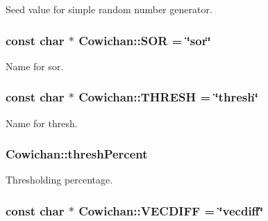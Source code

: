 Seed value for simple random number generator. \hypertarget{class_cowichan_eaac49e2ebb0c5149506f0544cd87794}{
\subsubsection[{SOR}]{\setlength{\rightskip}{0pt plus 5cm}const char $\ast$ {\bf Cowichan::SOR} = \char`\"{}sor\char`\"{}}}
\label{class_cowichan_eaac49e2ebb0c5149506f0544cd87794}


Name for sor. \hypertarget{class_cowichan_e7adc012eb484f209b869db5062dacd0}{
\subsubsection[{THRESH}]{\setlength{\rightskip}{0pt plus 5cm}const char $\ast$ {\bf Cowichan::THRESH} = \char`\"{}thresh\char`\"{}}}
\label{class_cowichan_e7adc012eb484f209b869db5062dacd0}


Name for thresh. \hypertarget{class_cowichan_a42c0ae639cc3ac124a013bc3e3162ad}{
\subsubsection[{threshPercent}]{ {\bf Cowichan::threshPercent}}}
\label{class_cowichan_a42c0ae639cc3ac124a013bc3e3162ad}


Thresholding percentage. \hypertarget{class_cowichan_d70f851efe3d20a89d7bcf5e7db70344}{
\subsubsection[{VECDIFF}]{\setlength{\rightskip}{0pt plus 5cm}const char $\ast$ {\bf Cowichan::VECDIFF} = \char`\"{}vecdiff\char`\"{}}}
\label{class_cowichan_d70f851efe3d20a89d7bcf5e7db70344}


